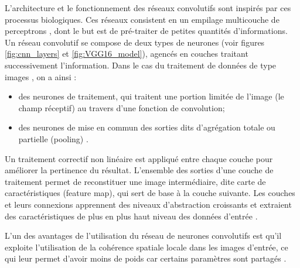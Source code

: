 	L'architecture et le fonctionnement des réseaux convolutifs sont inspirés par ces processus biologiques. Ces réseaux consistent en un empilage multicouche de perceptrons \cite{tammina2019transfer}, dont le but est de pré-traiter de petites quantités d'informations.\\
	Un réseau convolutif se compose de deux types de neurones (voir figures \ref{fig:cnn_layers} et \ref{fig:VGG16_model}), agencés en couches traitant successivement l'information. Dans le cas du traitement de données de type images \cite{antoine2018apprentissage}, on a ainsi : 
	
	\begin{itemize}
		\item des neurones de traitement, qui traitent une portion limitée de l'image (le champ réceptif) au travers d'une fonction de convolution\cite{tammina2019transfer, antoine2018apprentissage};
		\item des neurones de mise en commun des sorties dits d'agrégation totale ou partielle (pooling) \cite{tammina2019transfer, antoine2018apprentissage}.
		
	\end{itemize}

	
	Un traitement correctif non linéaire est appliqué entre chaque couche pour améliorer la pertinence du résultat. L'ensemble des sorties d'une couche de traitement permet de reconstituer une image intermédiaire, dite carte de caractéristiques (feature map), qui sert de base à la couche suivante. Les couches et leurs connexions apprennent des niveaux d'abstraction croissants et extraient des caractéristiques de plus en plus haut niveau des données d'entrée \cite{antoine2018apprentissage, shin2016deep}.
	
	L'un des avantages de l'utilisation du réseau de neurones convolutifs est qu'il exploite l'utilisation de la cohérence spatiale locale dans les images d'entrée, ce qui leur permet d'avoir moins de poids car certains paramètres sont partagés \cite{tammina2019transfer}.
	
